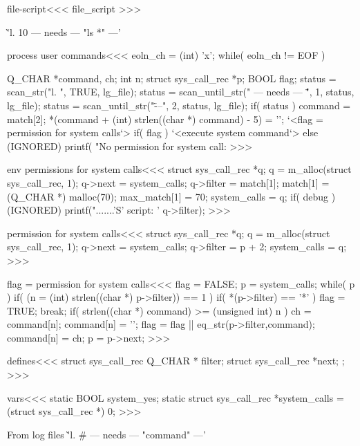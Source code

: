 \<file-script\><<<
file_script
>>>


\`'l. 10 --- needs --- "ls *" ---'

\<process user commands\><<<
eoln_ch = (int) 'x';
while( eoln_ch != EOF ) {              Q_CHAR *command, ch;
                                       int n;
                                       struct sys_call_rec *p;
                                       BOOL flag;
   status = scan_str("l. ", TRUE, lg_file);
   status = scan_until_str(" --- needs --- \"", 1, status, lg_file);
   status = scan_until_str("\" ---", 2, status, lg_file);
   if( status ){
      command = match[2];
      *(command + (int) strlen((char *) command) - 5) = '\0'; 
      `<flag = permission for system calls`>
      if( flag ){
        `<execute system command`>
      } else { (IGNORED) printf(
          "No permission for system call: %
}  }
>>>


\<env permissions for system calls\><<<
{     struct sys_call_rec *q;
  q = m_alloc(struct sys_call_rec, 1);
  q->next = system_calls;
  q->filter = match[1];
              match[1] = (Q_CHAR *) malloc(70);  max_match[1] = 70;
  system_calls = q;
if( debug ){  
   (IGNORED) printf(".......'S' script: '%
                                q->filter); }
}
>>>

\<permission for system calls\><<<
{     struct sys_call_rec *q;
  q = m_alloc(struct sys_call_rec, 1);
  q->next = system_calls;
  q->filter = p + 2;
  system_calls = q;
}
>>>


\<flag = permission for system calls\><<<
flag = FALSE;
p = system_calls;
while( p ){                    
  if( (n = (int) strlen((char *) p->filter)) == 1 ) {
     if( *(p->filter) == '*' ){
         flag = TRUE; break;
     }
  } 
  if( strlen((char *) command) >= (unsigned int) n ) {
      ch = command[n]; command[n] = '\0';
      flag = flag || eq_str(p->filter,command);
      command[n] = ch;
  }
  p = p->next;
}
>>>

\<defines\><<<
struct sys_call_rec{
  Q_CHAR * filter;
  struct sys_call_rec *next;
};
>>>


\<vars\><<<
static BOOL system_yes;
static struct sys_call_rec *system_calls = (struct sys_call_rec *) 0;
>>>








From log files \`'l. # --- needs --- "command" ---'










}
